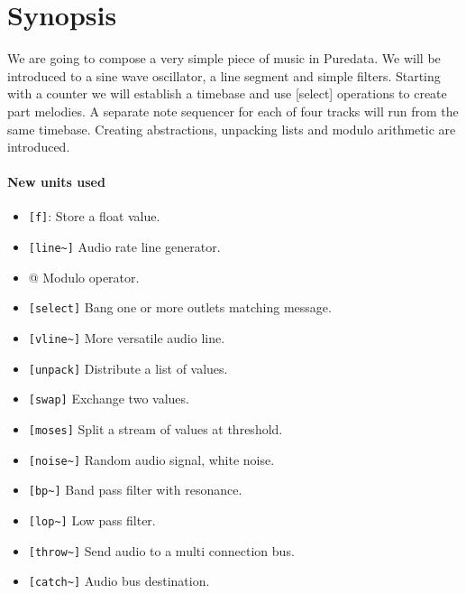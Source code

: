 \section{Synopsis}
We are going to compose a very simple piece of music in Puredata. We
will be introduced to a sine wave oscillator, a line segment and
simple filters. Starting with a counter we will establish a timebase
and use [select] operations to create part melodies. A separate note
sequencer for each of four tracks will run from the same timebase.
Creating abstractions, unpacking lists and modulo arithmetic are
introduced.

\paragraph{New units used}
\begin{itemize}
\item \verb+[f]+: Store a float value.
\item \verb+[line~]+ Audio rate line generator.
\item \verb@[mod]@ Modulo operator.
\item \verb+[select]+ Bang one or more outlets matching message.
\item \verb+[vline~]+ More versatile audio line.
\item \verb+[unpack]+ Distribute a list of values.
\item \verb+[swap]+ Exchange two values.
\item \verb+[moses]+ Split a stream of values at threshold.
\item \verb+[noise~]+ Random audio signal, white noise.
\item \verb+[bp~]+ Band pass filter with resonance.
\item \verb+[lop~]+ Low pass filter.
\item \verb+[throw~]+ Send audio to a multi connection bus.
\item \verb+[catch~]+ Audio bus destination.
\end{itemize} 